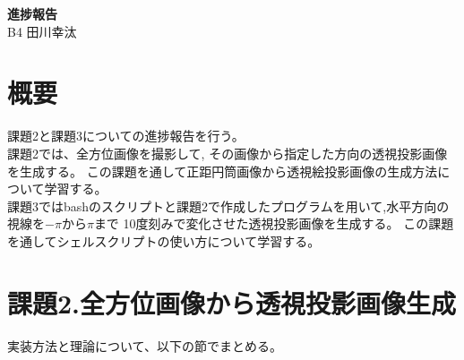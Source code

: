 \documentclass[]{jarticle}          %
\begin{document}

\vspace*{2ex}
\begin{center}
 {\Large \bf 進捗報告}\\ %
 \vspace*{5mm}
 {\large B4 田川幸汰}%
\end{center}



\section{概要}
 課題2と課題3についての進捗報告を行う。\\
 課題2では、全方位画像を撮影して, その画像から指定した方向の透視投影画像を生成する。
この課題を通して正距円筒画像から透視絵投影画像の生成方法について学習する。 \\
 課題3ではbashのスクリプトと課題2で作成したプログラムを用いて,水平方向の視線を$-\pi$から$\pi$まで
10度刻みで変化させた透視投影画像を生成する。
この課題を通してシェルスクリプトの使い方について学習する。 \\

\section{課題2.全方位画像から透視投影画像生成}
実装方法と理論について、以下の節でまとめる。
\end{document}
